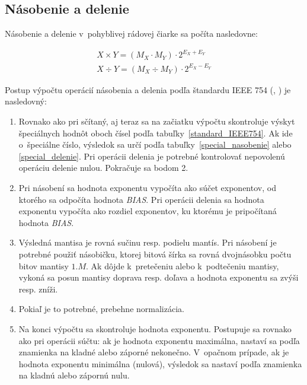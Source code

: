 \newpage
\subsection{Násobenie a delenie} \label{MulDivFP}
Násobenie a delenie v~pohyblivej rádovej čiarke sa počíta nasledovne:

\begin{eqnarray}
X \times Y = (M_{X} \cdot M_{Y})\cdot 2^{E_{X} + E_{Y}} \\
X \div Y = ({M_{X}} \div {M_{Y}})\cdot 2^{E_{X} - E_{Y}}
\end{eqnarray}

Postup výpočtu operácií násobenia a delenia podľa štandardu IEEE 754 (\cite{FPOnline_operacie}, \cite{CamborBP}) je nasledovný:

\begin{enumerate}  
\item Rovnako ako pri sčítaný, aj teraz sa na začiatku výpočtu skontroluje výskyt špeciálnych hodnôt oboch čísel podľa tabuľky~\ref{standard_IEEE754}. Ak ide o~špeciálne číslo, výsledok sa určí podľa tabuľky~\ref{special_nasobenie} alebo \ref{special_delenie}. Pri operácii delenia je potrebné kontrolovať nepovolenú operáciu delenie nulou. Pokračuje sa bodom 2.

\item Pri násobení sa hodnota exponentu vypočíta ako súčet exponentov, od ktorého sa odpočíta hodnota \textit{BIAS}. Pri operácii delenia sa hodnota exponentu vypočíta ako rozdiel exponentov, ku ktorému je pripočítaná hodnota \textit{BIAS}.

\item Výsledná mantisa je rovná sučinu resp. podielu mantís. Pri násobení je potrebné použiť násobičku, ktorej bitová šírka sa rovná dvojnásobku počtu bitov mantisy $ 1.M $. Ak dôjde k~pretečeniu alebo k~podtečeniu mantisy, vykoná sa posun mantisy doprava resp. doľava a hodnota exponentu sa zvýši resp. zníži.

\item Pokiaľ je to potrebné, prebehne normalizácia.

\item Na konci výpočtu sa skontroluje hodnota exponentu. Postupuje sa rovnako ako pri operácii súčtu: ak je hodnota exponentu maximálna, nastaví sa podľa znamienka na kladné alebo záporné nekonečno. V~opačnom prípade, ak je hodnota exponentu minimálna (nulová), výsledok sa nastaví podľa znamienka na kladnú alebo zápornú nulu.
\end{enumerate}


